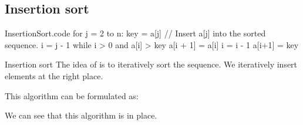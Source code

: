 \documentclass[a4paper]{article}
\begin{document}
\subsection{Insertion sort}


\begin{filecontents*}[overwrite]{InsertionSort.code}
for j = 2 to n:
    key = a[j]
    // Insert a[j] into the sorted sequence.
    i = j - 1
    while i > 0 and a[i] > key
        a[i + 1] = a[i]
        i = i - 1
    a[i+1] = key
\end{filecontents*}

\begin{parag}{Insertion sort}
    The idea of  is to iteratively sort the sequence. We iteratively insert elements at the right place.

    This algorithm can be formulated as:

    We can see that this algorithm is in place.
\end{parag}
\end{document}
